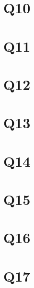 \documentclass[11pt]{article}
\begin{document}
\section*{Q10}
\section*{Q11}
\section*{Q12}
\section*{Q13}
\section*{Q14}
\section*{Q15}
\section*{Q16}
\section*{Q17}
\end{document}
